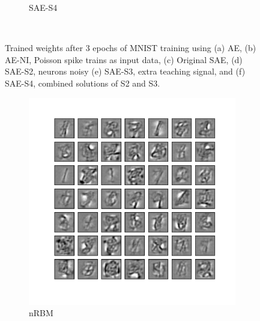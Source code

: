 \begin{figure}
\begin{subfigure}[t]{0.4\textwidth}
		\caption{SAE-S4}
	\end{subfigure}\\
	\caption{Trained weights after 3 epochs of MNIST training using (a) AE, (b) AE-NI, Poisson spike trains as input data, (c) Original SAE, (d) SAE-S2, neurons \protect{} \protect{} noisy \protect{} \protect{} (e) SAE-S3, extra teaching signal, and (f) SAE-S4, combined solutions of S2 and S3.}
	\label{fig:weights_ae}
\end{figure}

\begin{figure}
	\centering
	\begin{subfigure}[t]{0.4\textwidth}
		\includegraphics[width=\textwidth]{pics_sdlm/32_MNIST_RBM/2_60000_0.pdf}
		\caption{nRBM}
	\end{subfigure}
	\begin{subfigure}[t]{0.4\textwidth}

\end{subfigure}
\end{figure}
